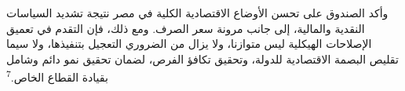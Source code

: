 وأكد الصندوق على تحسن الأوضاع الاقتصادية الكلية في مصر نتيجة تشديد السياسات النقدية والمالية، إلى جانب مرونة سعر الصرف. ومع ذلك، فإن التقدم في تعميق الإصلاحات الهيكلية ليس متوازنا، ولا يزال من الضروري التعجيل بتنفيذها، ولا سيما تقليص البصمة الاقتصادية للدولة، وتحقيق تكافؤ الفرص، لضمان تحقيق نمو دائم وشامل بقيادة القطاع الخاص.\textsuperscript{7}
